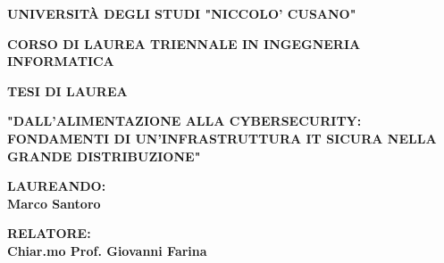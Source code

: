 \begin{titlepage}
    \setmainfont{Times New Roman} 
    \begin{center}
        \vspace*{2cm}
        
        {\Large \textbf{UNIVERSITÀ DEGLI STUDI "NICCOLO' CUSANO"}}\\
        \vspace{0.5cm}
        
        {\large \textbf{CORSO DI LAUREA TRIENNALE IN INGEGNERIA INFORMATICA}}\\
        
        \vspace{3cm}

        {\large \textbf{TESI DI LAUREA}}\\
        
        \vspace{2cm}
        
        {\Large \textbf{"DALL'ALIMENTAZIONE ALLA CYBERSECURITY: FONDAMENTI DI UN'INFRASTRUTTURA IT SICURA NELLA GRANDE DISTRIBUZIONE"}}        
        \vspace{4cm}
        
        
        \begin{minipage}{0.4\textwidth}
        \begin{flushleft} \large
        \textbf{LAUREANDO:}\\ \textbf{Marco Santoro}
        \end{flushleft}
        \end{minipage}
        \begin{minipage}{0.4\textwidth}
        \begin{flushright} \large
        \textbf{RELATORE:} \\
        \textbf{Chiar.mo Prof. Giovanni Farina}
        \end{flushright}
        \end{minipage}
        \vfill %
        \vspace*{1cm}
        

    

\end{center}
\end{titlepage}

